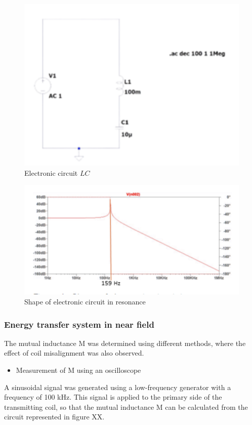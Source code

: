 \documentclass[conference]{IEEEtran}
\begin{document}
\begin{figure}[htbp]
	\centerline{\includegraphics[width=\linewidth]{images/22.png}}
	\caption{Electronic circuit \(LC\)}
	\label{fig}
\end{figure}
\begin{figure}[htbp]
	\centerline{\includegraphics[width=\linewidth]{images/23.png}}
	\caption{Shape of electronic circuit in resonance}
	\label{fig}
\end{figure}

\subsubsection{Energy transfer system in near field}
The mutual inductance M was determined using different methods, where the
effect of coil misalignment was also observed. \\
\begin{itemize}
	\item Measurement of M using an oscilloscope
\end{itemize}
	A sinusoidal signal was generated using a low-frequency generator with a frequency of
100 kHz. This signal is applied to the primary side of the transmitting coil, so that the
mutual inductance M can be calculated from the circuit represented in figure XX.
\end{document}
